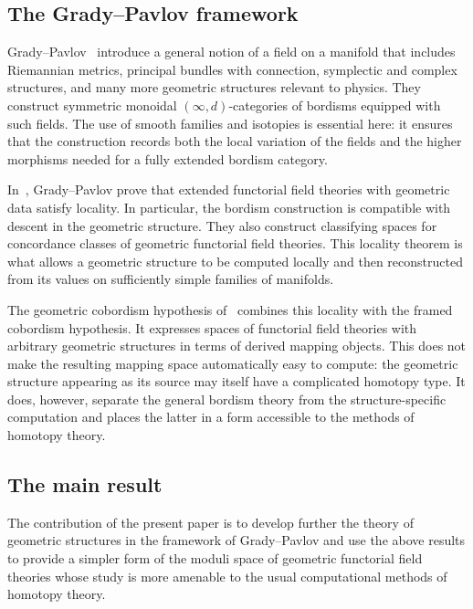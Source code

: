\documentclass{amsart}
\theoremstyle{definition}
\numberwithin{equation}{subsection}
\numberwithin{subsubsection}{subsection}
\begin{document}
\subsection{The Grady--Pavlov framework}

Grady--Pavlov~\cite{GP26} introduce a general notion of a field on a manifold
that includes Riemannian metrics, principal bundles with connection,
symplectic and complex structures, and many more geometric structures relevant
to physics.
They construct symmetric monoidal \((\infty,d)\)-categories of bordisms
equipped with such fields. The use of smooth families and isotopies is
essential here: it ensures that the construction records both the local
variation of the fields and the higher morphisms needed for a fully extended
bordism category.

In~\cite{GP23}, Grady--Pavlov prove that extended functorial field theories
with geometric data satisfy locality. In particular, the bordism
construction is compatible with descent in the geometric structure. They
also construct classifying spaces for concordance classes of geometric
functorial field theories. This locality theorem is what allows a geometric
structure to be computed locally and then reconstructed from its values on
sufficiently simple families of manifolds.

The geometric cobordism hypothesis of~\cite{GP22} combines this locality with
the framed cobordism hypothesis. It expresses spaces of functorial field
theories with arbitrary geometric structures in terms of derived mapping
objects. This does not make the resulting mapping space automatically easy to
compute: the geometric structure appearing as its source may itself have a
complicated homotopy type. It does, however, separate the general bordism
theory from the structure-specific computation and places the latter in a
form accessible to the methods of homotopy theory.

\subsection{The main result}

The contribution of the present paper is to develop further the theory of
geometric structures in the framework of Grady--Pavlov and use the above results
to provide a simpler form of the moduli space of geometric functorial field
theories whose study is more amenable to the usual computational methods of
homotopy theory.
\end{document}

